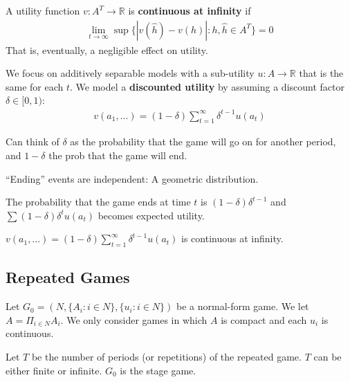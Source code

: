 \documentclass[11pt]{elegantbook}
\begin{document}
\begin{definition}
    \normalfont
    A utility function $v:A^T \rightarrow \mathbb{R}$ is \textbf{continuous at infinity} if
    \begin{equation}
        \begin{aligned}
            \lim_{t \rightarrow \infty}\sup\{|v(\hat{h})-v(h)|:h,\hat{h}\in A^T\}=0
        \end{aligned}
        \nonumber
    \end{equation}
    That is, eventually, a negligible effect on utility.
\end{definition}

\begin{definition}
\normalfont
We focus on additively separable models with a sub-utility $u:A \rightarrow \mathbb{R}$ that is the same for each $t$. We model a \textbf{discounted utility} by assuming a discount factor $\delta\in[0,1)$:
\begin{equation}
    \begin{aligned}
        v(a_1,...)=(1-\delta)\sum_{t=1}^\infty \delta^{t-1}u(a_t)
    \end{aligned}
    \nonumber
\end{equation}
\end{definition}
Can think of $\delta$ as the probability that the game will go on for another period, and $1-\delta$ the prob that the game will end.

“Ending” events are independent: A geometric distribution.

The probability that the game ends at time $t$ is $(1 - \delta)\delta^{t-1}$ and $\sum(1-\delta)\delta^t u(a_t)$ becomes expected utility.

\begin{proposition}
    $v(a_1,...)=(1-\delta)\sum_{t=1}^\infty \delta^{t-1}u(a_t)$ is continuous at infinity.
\end{proposition}


\subsection{Repeated Games}
Let $G_0=\left(N,\{A_i:i\in N\},\{u_i:i\in N\}\right)$ be a normal-form game. We let $A=\Pi_{i\in N}A_i$. We only consider games in which $A$ is compact and each $u_i$ is continuous.

Let $T$ be the number of periods (or repetitions) of the repeated game. $T$ can be either finite or infinite. $G_0$ is the stage game.
\end{document}
